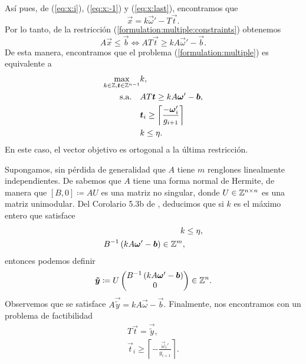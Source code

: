 Así pues, de (\ref{eq:x:i}), (\ref{eq:x:-1}) y (\ref{eq:x:last}), encontramos que
\begin{equation}
	\label{eq:transf}
	\vec{x} = k\vec{\omega}' - T\vec{t}.
\end{equation}
Por lo tanto, de la restricción (\ref{formulation:multiple:constraints}) obtenemos
\begin{equation}
	A\vec{x} \leq \vec{b} \iff AT\vec{t} \geq kA\vec{\omega}' - \vec{b}.
\end{equation}
De esta manera, encontramos que el problema (\ref{formulation:multiple}) es equivalente a
\begin{subequations}
	\label{formulation:lattice}
	\begin{align}
		\max_{k \in \mathbb{Z}, \boldsymbol{t} \in \mathbb{Z}^{n-1}}
			& k, \\
		\text{s.a.} \quad
			& AT\boldsymbol{t} \geq kA\boldsymbol{\omega}' - \boldsymbol{b}, \\
			& \boldsymbol{t}_i \geq \left\lceil \frac{-\boldsymbol{\omega}_i'}{g_{i + 1}} \right\rceil \\
			& k \leq \eta. \nonumber
	\end{align}
\end{subequations}
En este caso, el vector objetivo es ortogonal a la última restricción.

Supongamos, sin pérdida de generalidad que $A$ tiene $m$ renglones linealmente independientes. De
\cite{alex} sabemos que $A$ tiene una forma normal de Hermite, de manera que $[B, 0] \coloneq AU$ es una
matriz no singular, donde $U \in \mathbb{Z}^{n \times n}$ es una matriz unimodular. Del Corolario 5.3b de
\cite{alex}, deducimos que si $k$ es el máximo entero que satisface
\begin{align}
	k &\leq \eta, \\
	B^{-1}\left(k A\boldsymbol{\omega}' - \boldsymbol{b}\right) \in \mathbb{Z}^m,
\end{align}
entonces podemos definir
\begin{equation}
	\boldsymbol{\tilde{y}} \coloneq U\begin{pmatrix}
		B^{-1}\left(kA\boldsymbol{\omega}' - \boldsymbol{b}\right)
		\\ 0
	\end{pmatrix} \in \mathbb{Z}^n.
\end{equation}
Observemos que se satisface $A\vec{\tilde{y}} = kA\vec{\omega} - \vec{b}$. Finalmente, nos
encontramos con un problema de factibilidad
\begin{align*}
	T\vec{t} = \vec{\tilde{y}}, \\
	\vec{t}_i \geq \left\lceil -\frac{\vec{\omega}_i'}{g_{i + 1}} \right\rceil.
\end{align*}
